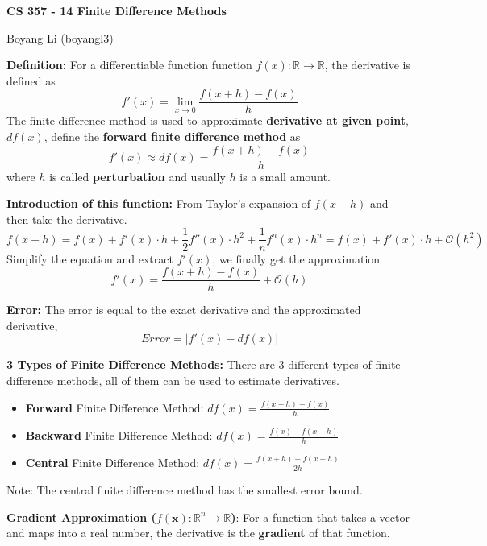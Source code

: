 \documentclass[12pt]{article}
\begin{document}
\begin{center}\Large\bf 
CS 357 - 14 Finite Difference Methods\\
\end{center}
\begin{center}
Boyang Li (boyangl3)
\end{center}

\medskip

\noindent \textbf{Definition: }For a differentiable function function $f(x): \mathbb{R} \to \mathbb{R}$, the derivative is defined as 
$$f'(x) = \lim_{x\to 0} \frac{f(x+h) - f(x)}{h}$$
The finite difference method is used to approximate \textbf{derivative at given point}, $df(x)$, define the \textbf{forward finite difference method} as 
$$f'(x) \approx df(x) = \frac{f(x+h) - f(x)}{h}$$
where $h$ is called \textbf{perturbation} and usually $h$ is a small amount.

\medskip
\noindent \textbf{Introduction of this function:} From Taylor's expansion of $f(x+h)$ and then take the derivative.
$$f(x+h) = f(x) + f'(x)\cdot h + \frac{1}{2}f''(x) \cdot h^2 + \frac{1}{n}f^n(x) \cdot h^n = f(x) + f'(x) \cdot h + \mathcal{O}(h^2)$$
Simplify the equation and extract $f'(x)$, we finally get the approximation
$$f'(x) = \frac{f(x+h) - f(x)}{h} + \mathcal{O}(h)$$

\medskip
\noindent \textbf{Error: }The error is equal to the exact derivative and the approximated derivative, $$Error = | f'(x) - df(x)|$$

\medskip
\noindent \textbf{3 Types of Finite Difference Methods: }There are 3 different types of finite difference methods, all of them can be used to estimate derivatives.
\begin{itemize}
    \item \textbf{Forward} Finite Difference Method: $\displaystyle df(x) = \frac{f(x+h) - f(x)}{h}$
    \item \textbf{Backward} Finite Difference Method: $\displaystyle df(x) = \frac{f(x) - f(x-h)}{h}$
    \item \textbf{Central} Finite Difference Method: $\displaystyle df(x) = \frac{f(x+h) - f(x-h)}{2h}$
\end{itemize}

Note: The central finite difference method has the smallest error bound.

\newpage

\noindent \textbf{Gradient Approximation ($f(\mathbf{x}) : \mathbb{R}^n \to \mathbb{R}$)}: For a function that takes a vector and maps into a real number, the derivative is the \textbf{gradient} of that function.
\end{document}
